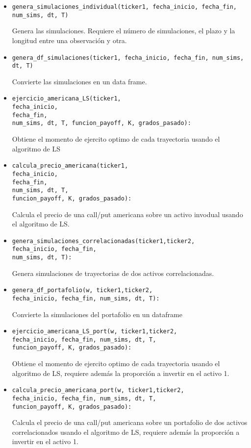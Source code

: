 \documentclass[11pt]{article}
\begin{document}
\begin{itemize}
\item \begin{verbatim}
genera_simulaciones_individual(ticker1, fecha_inicio, fecha_fin, num_sims, dt, T)
\end{verbatim}
Genera las simulaciones. Requiere el número de simulaciones, el plazo y la longitud entre una observación y otra.

\item \begin{verbatim}
genera_df_simulaciones(ticker1, fecha_inicio, fecha_fin, num_sims, dt, T)
\end{verbatim}
Convierte las simulaciones en un data frame.

\item \begin{verbatim}
ejercicio_americana_LS(ticker1, 
fecha_inicio, 
fecha_fin, 
num_sims, dt, T, funcion_payoff, K, grados_pasado):
\end{verbatim}
Obtiene el momento de ejercito optimo de cada trayectoria usando el algoritmo de LS

\item \begin{verbatim}
calcula_precio_americana(ticker1, 
fecha_inicio, 
fecha_fin, 
num_sims, dt, T, 
funcion_payoff, K, grados_pasado):
\end{verbatim}
Calcula el precio de una call/put americana sobre un activo invodual usando el algoritmo de LS.

\item \begin{verbatim}
genera_simulaciones_correlacionadas(ticker1,ticker2,
fecha_inicio, fecha_fin,
num_sims, dt, T):
\end{verbatim}
Genera simulaciones de trayectorias de dos activos correlacionadas.

\item \begin{verbatim}
genera_df_portafolio(w, ticker1,ticker2, 
fecha_inicio, fecha_fin, num_sims, dt, T):
\end{verbatim}
Convierte la simulaciones del portafolio en un dataframe

\item \begin{verbatim}
ejercicio_americana_LS_port(w, ticker1,ticker2, 
fecha_inicio, fecha_fin, num_sims, dt, T, 
funcion_payoff, K, grados_pasado):
\end{verbatim}
Obtiene el momento de ejercito optimo de cada trayectoria usando el algoritmo de LS, requiere además la proporción a invertir en el activo 1.

\item \begin{verbatim}
calcula_precio_americana_port(w, ticker1,ticker2,
fecha_inicio, fecha_fin, num_sims, dt, T,
funcion_payoff, K, grados_pasado):
\end{verbatim}
Calcula el precio de una call/put americana sobre un portafolio de dos activos correlacionados usando el algoritmo de LS, requiere además la proporción a invertir en el activo 1.
\end{itemize}
\end{document}
